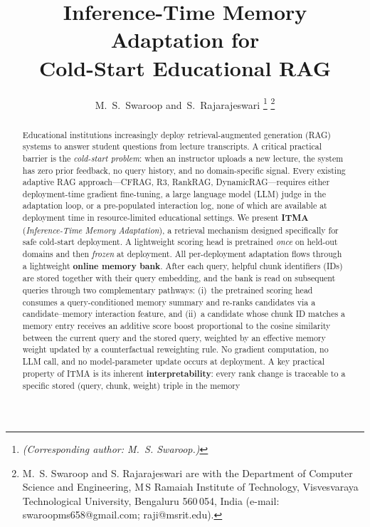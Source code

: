 \documentclass[journal]{IEEEtran}
\begin{document}
\title{Inference-Time Memory Adaptation for\\ Cold-Start Educational RAG}

\author{M.~S.~Swaroop and~S.~Rajarajeswari%
\thanks{\emph{(Corresponding author: M.~S. Swaroop.)}}%
\thanks{M.~S. Swaroop and S. Rajarajeswari are with the Department of
Computer Science and Engineering, M\,S Ramaiah Institute of Technology,
Visvesvaraya Technological University, Bengaluru 560\,054, India
(e-mail: swaroopms658@gmail.com; raji@msrit.edu).}%
}

\maketitle

\begin{abstract}
Educational institutions increasingly deploy retrieval-augmented generation
(RAG) systems to answer student questions from lecture transcripts.  A critical
practical barrier is the \emph{cold-start problem}: when an instructor uploads
a new lecture, the system has zero prior feedback, no query history, and no
domain-specific signal.  Every existing adaptive RAG approach---CFRAG, R3,
RankRAG, DynamicRAG---requires either deployment-time gradient fine-tuning, a
large language model (LLM) judge in the adaptation loop, or a pre-populated
interaction log, none of which are available at deployment time in
resource-limited educational settings.
We present \textbf{ITMA} (\emph{Inference-Time Memory Adaptation}), a
retrieval mechanism designed specifically for safe cold-start deployment.
A lightweight scoring head is pretrained \emph{once} on held-out domains and
then \emph{frozen} at deployment.  All per-deployment adaptation flows
through a lightweight \textbf{online memory bank}.  After each query, helpful
chunk identifiers (IDs) are stored together with their query embedding, and
the bank is read on subsequent queries through two complementary pathways:
(i)~the pretrained scoring head consumes a query-conditioned memory summary
and re-ranks candidates via a candidate--memory interaction feature, and
(ii)~a candidate whose chunk ID matches a memory entry receives an additive
score boost proportional to the cosine similarity between the current query
and the stored query, weighted by an effective memory weight updated by a
counterfactual reweighting rule.  No gradient computation, no LLM call, and
no model-parameter update occurs at deployment.  A key practical property of
ITMA is its inherent \textbf{interpretability}: every rank change is
traceable to a specific stored (query, chunk, weight) triple in the memory

\end{abstract}
\end{document}
